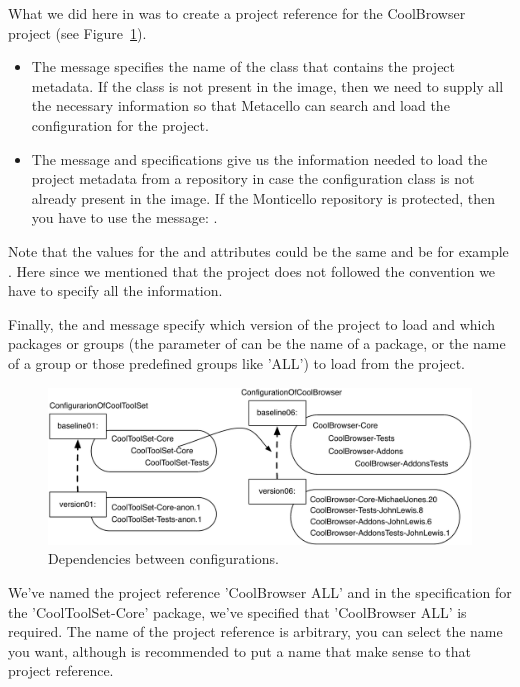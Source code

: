 \documentclass[a4paper,10pt,twoside]{book}
\begin{document}
What we did here in  was to create a project reference for the CoolBrowser project (see Figure~\ref{fig:version07}). 

\begin{itemize}
\item The message  specifies the name of the class that contains the project metadata. If the class is not present in the image, then we need to supply all the necessary information so that Metacello can search and load the configuration for the project.


\item The message  and  specifications give us the information needed to load the project metadata from a repository in case the configuration class is not already present in the image. If the Monticello repository is protected, then you have to use the message: .

\end{itemize}
Note that the values for the  and  attributes could be the same and be for example . Here since we mentioned that the project does not followed the convention we have to specify all the information. 

Finally, the  and  message specify which version of the project to load and which packages or groups (the parameter of  can be the name of a package, or the name of a group or those predefined groups like 'ALL') to load from the project. 

\begin{figure}
\begin{center}
\includegraphics[width=0.6\linewidth]{version07}
\caption{Dependencies between configurations.\label{fig:version07}}
\end{center}
\end{figure} 


We've named the project reference 'CoolBrowser ALL' and in the specification for the 'CoolToolSet-Core' package, we've specified that 'CoolBrowser ALL' is required. The name of the project reference is arbitrary, you can select the name you want, although is recommended to put a name that make sense to that project reference. 
\end{document}
